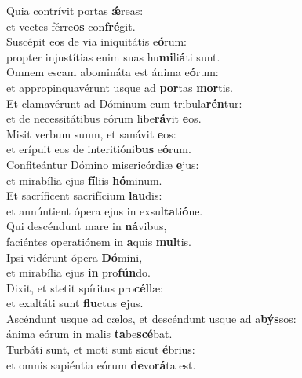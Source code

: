 \evenverse Quia contrívit portas \textbf{ǽ}reas:~\*\\
\evenverse et vectes férre\textbf{os} con\textbf{fré}git.\\
\oddverse Suscépit eos de via iniquitátis e\textbf{ó}rum:~\*\\
\oddverse propter injustítias enim suas hu\textbf{mi}li\textbf{á}ti sunt.\\
\evenverse Omnem escam abomináta est ánima e\textbf{ó}rum:~\*\\
\evenverse et appropinquavérunt usque ad \textbf{por}tas \textbf{mor}tis.\\
\oddverse Et clamavérunt ad Dóminum cum tribula\textbf{rén}tur:~\*\\
\oddverse et de necessitátibus eórum libe\textbf{rá}vit \textbf{e}os.\\
\evenverse Misit verbum suum, et sanávit \textbf{e}os:~\*\\
\evenverse et erípuit eos de interitióni\textbf{bus} e\textbf{ó}rum.\\
\oddverse Confiteántur Dómino misericórdiæ \textbf{e}jus:~\*\\
\oddverse et mirabília ejus \textbf{fí}liis \textbf{hó}minum.\\
\evenverse Et sacríficent sacrifícium \textbf{lau}dis:~\*\\
\evenverse et annúntient ópera ejus in exsul\textbf{ta}ti\textbf{ó}ne.\\
\oddverse Qui descéndunt mare in \textbf{ná}vibus,~\*\\
\oddverse faciéntes operatiónem in \textbf{a}quis \textbf{mul}tis.\\
\evenverse Ipsi vidérunt ópera \textbf{Dó}mini,~\*\\
\evenverse et mirabília ejus \textbf{in} pro\textbf{fún}do.\\
\oddverse Dixit, et stetit spíritus pro\textbf{cél}læ:~\*\\
\oddverse et exaltáti sunt \textbf{flu}ctus \textbf{e}jus.\\
\evenverse Ascéndunt usque ad cælos, et descéndunt usque ad a\textbf{býs}sos:~\*\\
\evenverse ánima eórum in malis \textbf{ta}be\textbf{scé}bat.\\
\oddverse Turbáti sunt, et moti sunt sicut \textbf{é}brius:~\*\\
\oddverse et omnis sapiéntia eórum \textbf{de}vo\textbf{rá}ta est.\\
